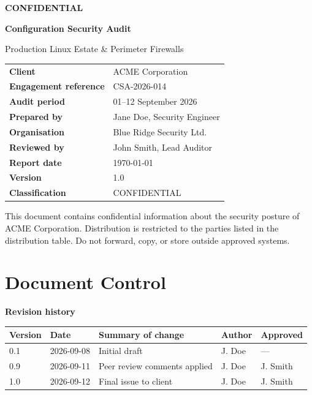 \documentclass[11pt,a4paper]{article}
\newcommand{\ClientName}{ACME Corporation}
\newcommand{\SystemName}{Production Linux Estate \& Perimeter Firewalls}
\newcommand{\EngagementRef}{CSA-2026-014}
\newcommand{\AuditorName}{Jane Doe, Security Engineer}
\newcommand{\AuditorOrg}{Blue Ridge Security Ltd.}
\newcommand{\ReviewerName}{John Smith, Lead Auditor}
\newcommand{\AuditPeriod}{01--12 September 2026}
\newcommand{\ReportDate}{\today}
\newcommand{\DocVersion}{1.0}
\newcommand{\Classification}{CONFIDENTIAL}
\begin{document}
\begin{titlepage}
\centering
\vspace*{1.5cm}
{\small\bfseries\Classification}\\[2cm]
{\Huge\bfseries Configuration Security Audit\par}
\vspace{0.6cm}
{\LARGE \SystemName\par}
\vspace{2cm}
\begin{tabular}{@{}>{\bfseries}l l@{}}
\toprule
Client & \ClientName \\
Engagement reference & \EngagementRef \\
Audit period & \AuditPeriod \\
Prepared by & \AuditorName \\
Organisation & \AuditorOrg \\
Reviewed by & \ReviewerName \\
Report date & \ReportDate \\
Version & \DocVersion \\
Classification & \Classification \\
\bottomrule
\end{tabular}
\vfill
{\footnotesize This document contains confidential information about the security posture of
\ClientName. Distribution is restricted to the parties listed in the distribution table.
Do not forward, copy, or store outside approved systems.\par}
\end{titlepage}

\section*{Document Control}

\noindent\textbf{Revision history}
\begin{longtable}{@{}l l p{5.6cm} l l@{}}
\toprule
\textbf{Version} & \textbf{Date} & \textbf{Summary of change} & \textbf{Author} & \textbf{Approved} \\
\midrule\endhead
0.1 & 2026-09-08 & Initial draft & J. Doe & --- \\
0.9 & 2026-09-11 & Peer review comments applied & J. Doe & J. Smith \\
1.0 & 2026-09-12 & Final issue to client & J. Doe & J. Smith \\
\bottomrule
\end{longtable}
\end{document}
